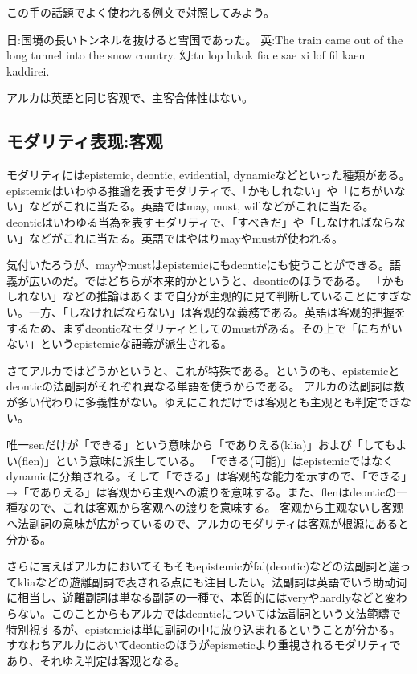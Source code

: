 この手の話題でよく使われる例文で対照してみよう。

日:国境の長いトンネルを抜けると雪国であった。
英:The train came out of the long tunnel into the snow country.
幻:tu lop lukok fia e sae xi lof fil kaen kaddirei.

アルカは英語と同じ客观で、主客合体性はない。

\subsection{モダリティ表现:客观}

モダリティにはepistemic, deontic, evidential, dynamicなどといった種類がある。
epistemicはいわゆる推論を表すモダリティで、「かもしれない」や「にちがいない」などがこれに当たる。英語ではmay, must, willなどがこれに当たる。
deonticはいわゆる当為を表すモダリティで、「すべきだ」や「しなければならない」などがこれに当たる。英語ではやはりmayやmustが使われる。

気付いたろうが、mayやmustはepistemicにもdeonticにも使うことができる。語義が広いのだ。ではどちらが本来的かというと、deonticのほうである。
「かもしれない」などの推論はあくまで自分が主观的に見て判断していることにすぎない。一方、「しなければならない」は客观的な義務である。英語は客观的把握をするため、まずdeonticなモダリティとしてのmustがある。その上で「にちがいない」というepistemicな語義が派生される。

さてアルカではどうかというと、これが特殊である。というのも、epistemicとdeonticの法副詞がそれぞれ異なる単語を使うからである。
アルカの法副詞は数が多い代わりに多義性がない。ゆえにこれだけでは客观とも主观とも判定できない。

唯一senだけが「できる」という意味から「でありえる(klia)」および「してもよい(flen)」という意味に派生している。
「できる(可能)」はepistemicではなくdynamicに分類される。そして「できる」は客观的な能力を示すので、「できる」→「でありえる」は客观から主观への渡りを意味する。また、flenはdeonticの一種なので、これは客观から客观への渡りを意味する。
客观から主观ないし客观へ法副詞の意味が広がっているので、アルカのモダリティは客观が根源にあると分かる。

さらに言えばアルカにおいてそもそもepistemicがfal(deontic)などの法副詞と違ってkliaなどの遊離副詞で表される点にも注目したい。法副詞は英語でいう助动词に相当し、遊離副詞は単なる副詞の一種で、本質的にはveryやhardlyなどと変わらない。このことからもアルカではdeonticについては法副詞という文法範疇で特別視するが、epistemicは単に副詞の中に放り込まれるということが分かる。すなわちアルカにおいてdeonticのほうがepismeticより重視されるモダリティであり、それゆえ判定は客观となる。

